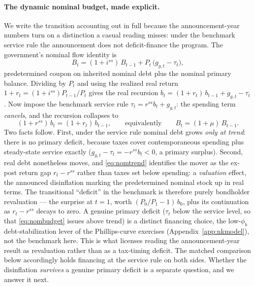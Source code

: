 \documentclass[12pt]{article}
\begin{document}
\paragraph{The dynamic nominal budget, made explicit.} We write the
transition accounting out in full because the announcement-year numbers turn
on a distinction a casual reading misses: under the benchmark service rule
the announcement does not deficit-finance the program. The government's nominal flow identity is
\begin{equation}
B_t = (1+i^{ss})\,B_{t-1} + P_t\,\bigl(g_{g,t}-\tau_t\bigr),
\label{eq:nombudget}
\end{equation}
predetermined coupon on inherited nominal debt plus the nominal primary
balance. Dividing by $P_t$ and using the realized real return
$1+r_t=(1+i^{ss})P_{t-1}/P_t$ gives the real recursion
$b_t = (1+r_t)\,b_{t-1} + g_{g,t}-\tau_t$. Now impose the benchmark service
rule $\tau_t=r^{ss}b_t+g_{g,t}$: the spending term \emph{cancels}, and the
recursion collapses to
\begin{equation}
(1+r^{ss})\,b_t = (1+r_t)\,b_{t-1},
\qquad\text{equivalently}\qquad
B_t = (1+\mu)\,B_{t-1}.
\label{eq:nomtrend}
\end{equation}
Two facts follow. First, under the service rule nominal debt grows
\emph{only at trend}: there is no primary deficit, because taxes cover
contemporaneous spending plus steady-state service exactly
($g_{g,t}-\tau_t = -r^{ss}b_t <0$, a primary surplus). Second, real debt
nonetheless moves, and \eqref{eq:nomtrend} identifies the mover as the
ex-post return gap $r_t-r^{ss}$ rather than taxes set below spending: a
\emph{valuation} effect, the announced disinflation marking the
predetermined nominal stock up in real terms. The transitional ``deficit''
in the benchmark is therefore purely bondholder revaluation --- the surprise
at $t=1$, worth $(P_0/P_1-1)\,b_0$, plus its continuation as $r_t-r^{ss}$
decays to zero. A genuine primary deficit ($\tau_t$ below the service level,
so that \eqref{eq:nombudget} issues above trend) is a distinct financing
choice, the low-$\phi_b$ debt-stabilization lever of the Phillips-curve
exercises (Appendix~\ref{app:nkmodel}), not the benchmark here. This is what
licenses reading the announcement-year result as revaluation rather than as
a tax-timing deficit. The matched comparison below accordingly holds
financing at the service rule on both sides. Whether the disinflation
\emph{survives} a genuine primary deficit is a separate question, and we
answer it next.
\end{document}
